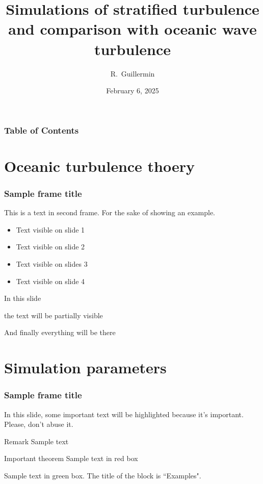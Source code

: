 \documentclass{beamer}
\title[Reasearch Training III] %
{Simulations of stratified turbulence and comparison with oceanic wave turbulence}
\subtitle{}
\author[Guillermin] %
{R.~Guillermin}
\institute[UGA] %
{
  Graduate School @ UGA\\
  Université Grenoble Alpes
}
\date[Feb 6 2025] %
{February 6, 2025}
\begin{document}
\frame{\titlepage}


\begin{frame}
\frametitle{Table of Contents}
\tableofcontents
\end{frame}


\section{Oceanic turbulence thoery}

\begin{frame}
\frametitle{Sample frame title}
This is a text in second frame. For the sake of showing an example.

\begin{itemize}
    \item<1-> Text visible on slide 1
    \item<2-> Text visible on slide 2
    \item<3> Text visible on slides 3
    \item<4-> Text visible on slide 4
\end{itemize}
\end{frame}



\begin{frame}
In this slide 

the text will be partially visible

And finally everything will be there
\end{frame}

\section{Simulation parameters}

\begin{frame}
\frametitle{Sample frame title}

In this slide, some important text will be
\alert{highlighted} because it's important.
Please, don't abuse it.

\begin{block}{Remark}
Sample text
\end{block}

\begin{alertblock}{Important theorem}
Sample text in red box
\end{alertblock}

\begin{examples}
Sample text in green box. The title of the block is ``Examples".
\end{examples}
\end{frame}
\end{document}
